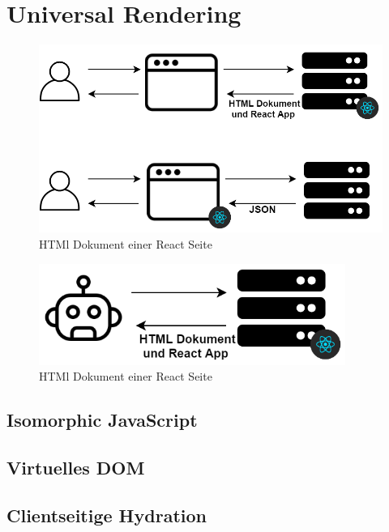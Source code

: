 \documentclass[runningheads]{llncs}
\begin{document}
\newpage

\section{Universal Rendering}
\label{sec:Universal Rendering}

\begin{figure}[h]
  \centering
  \includegraphics[width=12cm]{images/react}
  \caption{HTMl Dokument einer React Seite}
\end{figure}


\begin{figure}[h]
  \centering
  \includegraphics[width=10cm]{images/universalseo}
  \caption{HTMl Dokument einer React Seite}
\end{figure}

\subsection{Isomorphic JavaScript}
\label{subsec:Isomorphic JavaScript}


\subsection{Virtuelles DOM}
\label{subsec:Virtuelles DOM}

\subsection{Clientseitige Hydration}
\label{subsec:Clientseitige Hydration}
\end{document}
